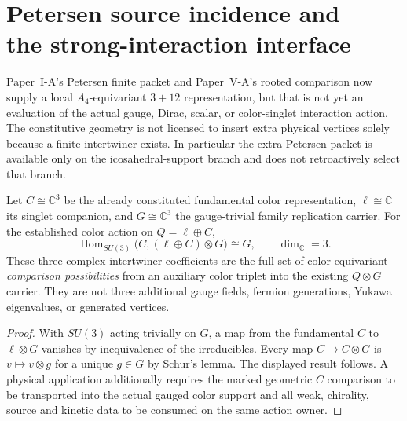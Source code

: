 \documentclass[12pt,a4paper]{article}
\begin{document}

\section[Petersen source incidence and the strong-interaction interface]{Petersen source incidence and\\ the strong-interaction interface}
\label{p5c:sec:v321-petersen-interaction}

Paper~I-A's Petersen finite packet and Paper~V-A's rooted comparison now
supply a local $A_4$-equivariant $3+12$ representation, but that is not
yet an evaluation of the actual gauge, Dirac, scalar, or color-singlet
interaction action. The constitutive geometry is not licensed to insert
extra physical vertices solely because a finite intertwiner exists.
In particular the extra Petersen packet is available only on the
icosahedral-support branch and does not retroactively select that branch.

\begin{proposition}
\label{p5c:prop:v321-petersen-color-arrows}
Let $C\cong\mathbb C^3$ be the already constituted fundamental color
representation, $\ell\cong\mathbb C$ its singlet companion, and
$G\cong\mathbb C^3$ the gauge-trivial family replication carrier. For the
established color action on $Q=\ell\oplus C$,
\[
 \boxed{\operatorname{Hom}_{SU(3)}
        \bigl(C,(\ell\oplus C)\otimes G\bigr)
       \cong G,\qquad \dim_{\mathbb C}=3.}
\]
These three complex intertwiner coefficients are the full set of
color-equivariant \emph{comparison possibilities} from an auxiliary
color triplet into the existing $Q\otimes G$ carrier. They are not
three additional gauge fields, fermion generations, Yukawa eigenvalues,
or generated vertices.
\end{proposition}
\begin{proof}
With $SU(3)$ acting trivially on $G$, a map from the fundamental $C$ to
$\ell\otimes G$ vanishes by inequivalence of the irreducibles. Every map
$C\to C\otimes G$ is $v\mapsto v\otimes g$ for a unique $g\in G$ by
Schur's lemma. The displayed result follows. A physical application
additionally requires the marked geometric $C$ comparison to be transported
into the actual gauged color support and all weak, chirality, source and
kinetic data to be consumed on the same action owner.
\end{proof}
\end{document}
